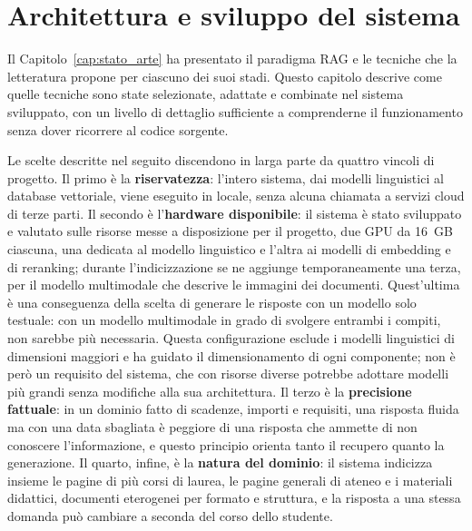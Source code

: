 \chapter{Architettura e sviluppo del sistema}\label{cap:architettura}

Il Capitolo~\ref{cap:stato_arte} ha presentato il paradigma RAG e le tecniche che la letteratura propone per
ciascuno dei suoi stadi. Questo capitolo descrive come quelle tecniche sono state selezionate, adattate e combinate
nel sistema sviluppato, con un livello di dettaglio sufficiente a comprenderne il funzionamento senza dover
ricorrere al codice sorgente.

Le scelte descritte nel seguito discendono in larga parte da quattro vincoli di progetto. Il primo è la
\textbf{riservatezza}: l'intero sistema, dai modelli linguistici al database vettoriale, viene eseguito in locale,
senza alcuna chiamata a servizi cloud di terze parti. Il secondo è l'\textbf{hardware disponibile}: il sistema è stato
sviluppato e valutato sulle risorse messe a disposizione per il progetto, due GPU da 16~GB ciascuna, una dedicata
al modello linguistico e l'altra ai modelli di embedding e di reranking; durante l'indicizzazione se ne aggiunge
temporaneamente una terza, per il modello multimodale che descrive le immagini dei documenti. Quest'ultima è
una conseguenza della scelta di generare le risposte con un modello solo testuale:
con un modello multimodale in grado di svolgere entrambi i compiti, non sarebbe più necessaria. Questa configurazione esclude i modelli
linguistici di dimensioni maggiori e ha guidato il dimensionamento di ogni componente; non è però un requisito del
sistema, che con risorse diverse potrebbe adottare modelli più grandi senza modifiche alla sua architettura. Il terzo è la \textbf{precisione fattuale}: in un dominio
fatto di scadenze, importi e requisiti, una risposta fluida ma con una data sbagliata è peggiore di una risposta che
ammette di non conoscere l'informazione, e questo principio orienta tanto il recupero quanto la generazione. Il
quarto, infine, è la \textbf{natura del dominio}: il sistema indicizza insieme le pagine di più corsi di laurea,
le pagine generali di ateneo e i materiali didattici, documenti eterogenei per formato e struttura, e la risposta a
una stessa domanda può cambiare a seconda del corso dello studente.












